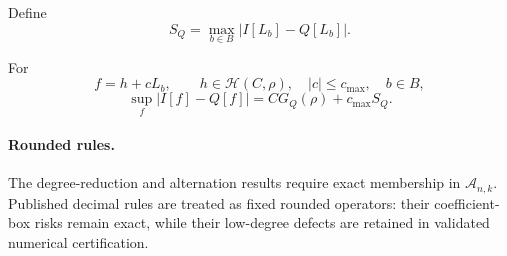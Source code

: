 Define
\[
S_Q=\max_{b\in B}|I[L_b]-Q[L_b]|.
\]

\begin{theorem}
For
\[
f=h+cL_b,\qquad
h\in\mathcal H(C,\rho),\quad
|c|\le c_{\max},\quad b\in B,
\]
\[
\sup_f|I[f]-Q[f]|
=
C G_Q(\rho)+c_{\max}S_Q.
\]
\end{theorem}

\paragraph{Rounded rules.}
The degree-reduction and alternation results require exact membership in
\(\mathcal A_{n,k}\). Published decimal rules are treated as fixed
rounded operators: their coefficient-box risks remain exact, while
their low-degree defects are retained in validated numerical
certification.
